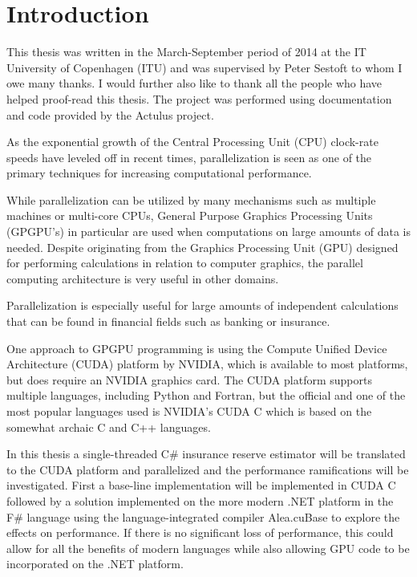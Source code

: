 \section{Introduction}
This thesis was written in the March-September period of 2014 at the IT University of Copenhagen (ITU) and was supervised by Peter Sestoft to whom I owe many thanks. 
I would further also like to thank all the people who have helped proof-read this thesis.
The project was performed using documentation and code provided by the Actulus project\cite{actulus}.

As the exponential growth of the Central Processing Unit (CPU) clock-rate speeds have leveled off in recent times\cite{ross2008cpu}, parallelization is seen as one of the primary techniques for increasing computational performance. 

While parallelization can be utilized by many mechanisms such as multiple machines or multi-core CPUs, General Purpose Graphics Processing Units (GPGPU's) in particular are used when computations on large amounts of data is needed. 
Despite originating from the Graphics Processing Unit (GPU) designed for performing calculations in relation to computer graphics, the parallel computing architecture is very useful in other domains.

Parallelization is especially useful for large amounts of independent calculations that can be found in financial fields such as banking or insurance.

One approach to GPGPU programming is using the Compute Unified Device Architecture (CUDA) platform by NVIDIA, which is available to most platforms, but does require an NVIDIA graphics card.
The CUDA platform supports multiple languages, including Python and Fortran, but the official and one of the most popular languages used is NVIDIA's CUDA C which is based on the somewhat archaic C and C++ languages.

In this thesis a single-threaded C\# insurance reserve estimator will be translated to the CUDA platform and parallelized and the performance ramifications will be investigated.
First a base-line implementation will be implemented in CUDA C followed by a solution implemented on the more modern .NET platform in the F\# language using the language-integrated compiler Alea.cuBase to explore the effects on performance.
If there is no significant loss of performance, this could allow for all the benefits of modern languages while also allowing GPU code to be incorporated on the .NET platform.

